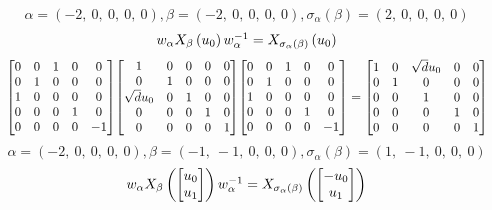 \documentclass[11pt]{article}
\theoremstyle{definition}
\begin{document}
\providecommand{\scaletoalign}[2]{%
  \sbox0{$#2$}%
  \ifdim\wd0>#1\relax 
    \resizebox{#1}{!}{\usebox0}%
  \else 
    \usebox0%
  \fi 
}
\[
\alpha = \left( -2, \  0, \  0, \  0, \  0\right), \beta = \left( -2, \  0, \  0, \  0, \  0\right), \sigma_{\alpha}(\beta) = \left( 2, \  0, \  0, \  0, \  0\right)
\]
\[
\scaletoalign{\textwidth}{w_{\alpha} X_{\beta}\left(u_{0}\right) w_{\alpha}^{-1} = X_{\sigma_{\alpha}\left(\beta\right)}\left(u_{0}\right)}
\]
\[
\scaletoalign{\textwidth}{{\left[\begin{matrix}0 & 0 & 1 & 0 & 0\\0 & 1 & 0 & 0 & 0\\1 & 0 & 0 & 0 & 0\\0 & 0 & 0 & 1 & 0\\0 & 0 & 0 & 0 & -1\end{matrix}\right]} {\left[\begin{matrix}1 & 0 & 0 & 0 & 0\\0 & 1 & 0 & 0 & 0\\\sqrt{d} u_{0} & 0 & 1 & 0 & 0\\0 & 0 & 0 & 1 & 0\\0 & 0 & 0 & 0 & 1\end{matrix}\right]} {\left[\begin{matrix}0 & 0 & 1 & 0 & 0\\0 & 1 & 0 & 0 & 0\\1 & 0 & 0 & 0 & 0\\0 & 0 & 0 & 1 & 0\\0 & 0 & 0 & 0 & -1\end{matrix}\right]} = {\left[\begin{matrix}1 & 0 & \sqrt{d} u_{0} & 0 & 0\\0 & 1 & 0 & 0 & 0\\0 & 0 & 1 & 0 & 0\\0 & 0 & 0 & 1 & 0\\0 & 0 & 0 & 0 & 1\end{matrix}\right]}}
\]
\[
\alpha = \left( -2, \  0, \  0, \  0, \  0\right), \beta = \left( -1, \  -1, \  0, \  0, \  0\right), \sigma_{\alpha}(\beta) = \left( 1, \  -1, \  0, \  0, \  0\right)
\]
\[
\scaletoalign{\textwidth}{w_{\alpha} X_{\beta}\left(\left[\begin{matrix}u_{0}\\u_{1}\end{matrix}\right]\right) w_{\alpha}^{-1} = X_{\sigma_{\alpha}\left(\beta\right)}\left(\left[\begin{matrix}- u_{0}\\u_{1}\end{matrix}\right]\right)}
\]
\end{document}
